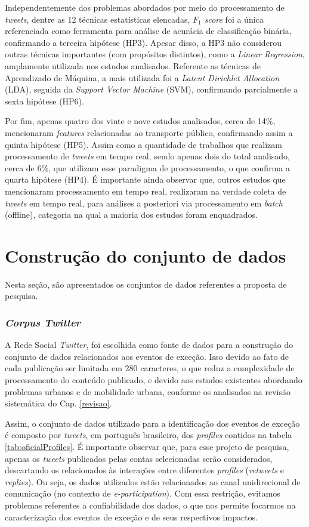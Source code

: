 \documentclass[
	12pt,				%
	oneside,			%
	a4paper,			%
	english,			%
	brazil				%
	]{abntex2ppgsi}
\begin{document}
Independentemente dos problemas abordados por meio do processamento de \textit{tweets}, dentre as 12 técnicas estatísticas elencadas, \textit{${F_1}$ score} foi a única referenciada como ferramenta para análise de acurácia de classificação binária, confirmando a terceira hipótese (HP3). Apesar disso, a HP3 não considerou outras técnicas importantes (com propósitos distintos), como a \textit{Linear Regression}, amplamente utilizada nos estudos analisados. Referente as técnicas de Aprendizado de Máquina, a mais utilizada foi a \textit{Latent Dirichlet Allocation} (LDA), seguida da \textit{Support Vector Machine} (SVM), confirmando parcialmente a sexta hipótese (HP6).

Por fim, apenas quatro dos vinte e nove estudos analisados, cerca de 14\%, mencionaram \textit{features} relacionadas ao transporte público, confirmando assim a quinta hipótese (HP5). Assim como a quantidade de trabalhos que realizam processamento de \textit{tweets} em tempo real, sendo apenas dois do total analisado, cerca de 6\%, que utilizam esse paradigma de processamento, o que confirma a quarta hipótese (HP4). É importante ainda observar que, outros estudos que mencionaram processamento em tempo real, realizaram na verdade coleta de \textit{tweets} em tempo real, para análises a posteriori via processamento em \textit{batch} (offline), categoria na qual a maioria dos estudos foram enquadrados.

\chapter{Construção do conjunto de dados}
\label{dataSet}

Nesta seção, são apresentados os conjuntos de dados referentes a proposta de pesquisa.

\subsection{\textit{Corpus Twitter}}

A Rede Social \textit{Twitter}, foi escolhida como fonte de dados para a construção do conjunto de dados relacionados aos eventos de exceção. Isso devido ao fato de cada publicação ser limitada em 280 caracteres, o que reduz a complexidade de processamento do conteúdo publicado, e devido aos estudos existentes abordando problemas urbanos e de mobilidade urbana, conforme os analisados na revisão sistemática do Cap. \ref{revisao}.

Assim, o conjunto de dados utilizado para a identificação dos eventos de exceção é composto por \textit{tweets}, em português brasileiro, dos \textit{profiles} contidos na tabela \ref{tab:oficialProfiles}. É importante observar que, para esse projeto de pesquisa, apenas os \textit{tweets} publicados pelas contas selecionadas serão considerados, descartando os relacionados às interações entre diferentes \textit{profiles} (\textit{retweets} e \textit{replies}). Ou seja, os dados utilizados estão relacionados ao canal unidirecional de comunicação (no contexto de \textit{e-participation}). Com essa restrição, evitamos problemas referentes a confiabilidade dos dados, o que nos permite focarmos na caracterização dos eventos de exceção e de seus respectivos impactos.
\end{document}
